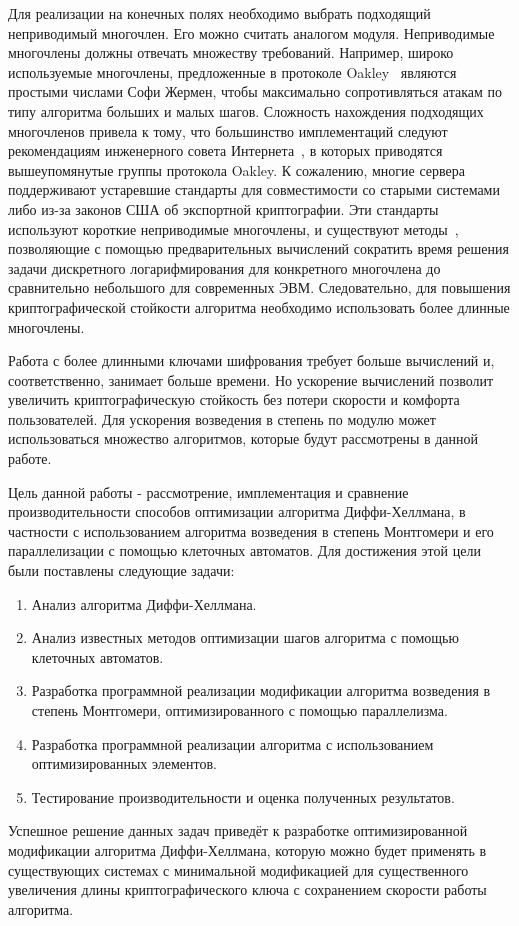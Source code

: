 \documentclass[times,specification,annotation]{itmo-student-thesis}
\begin{document}
Для реализации на конечных полях необходимо выбрать подходящий неприводимый многочлен.
Его можно считать аналогом модуля.
Неприводимые многочлены должны отвечать множеству требований.
Например, широко используемые многочлены, предложенные в протоколе Oakley~\cite{rfc2412} являются простыми числами
Софи Жермен, чтобы максимально сопротивляться атакам по типу алгоритма больших и малых шагов.
Сложность нахождения подходящих многочленов привела к тому, что большинство имплементаций следуют рекомендациям
инженерного совета Интернета~\cite{rfc7296}, в которых приводятся вышеупомянутые группы протокола Oakley.
К сожалению, многие сервера поддерживают устаревшие стандарты для совместимости со старыми системами либо
из-за законов США об экспортной криптографии.
Эти стандарты используют короткие неприводимые многочлены, и существуют методы~\cite{adr15},
позволяющие с помощью предварительных вычислений сократить время решения задачи дискретного логарифмирования для
конкретного многочлена до сравнительно небольшого для современных ЭВМ.
Следовательно, для повышения криптографической стойкости алгоритма необходимо использовать более длинные многочлены.\par
Работа с более длинными ключами шифрования требует больше вычислений и, соответственно, занимает больше времени.
Но ускорение вычислений позволит увеличить криптографическую стойкость без потери скорости и комфорта пользователей.
Для ускорения возведения в степень по модулю может использоваться множество алгоритмов, которые будут рассмотрены в
данной работе.\par
Цель данной работы - рассмотрение, имплементация и сравнение производительности способов оптимизации алгоритма
Диффи-Хеллмана, в частности с использованием алгоритма возведения в степень Монтгомери и его параллелизации
с помощью клеточных автоматов.
Для достижения этой цели были поставлены следующие задачи:
\begin{enumerate}[label=\arabic*.]
    \item Анализ алгоритма Диффи-Хеллмана.
    \item Анализ известных методов оптимизации шагов алгоритма с помощью клеточных автоматов.
    \item Разработка программной реализации модификации алгоритма возведения в степень Монтгомери, оптимизированного с помощью параллелизма.
    \item Разработка программной реализации алгоритма с использованием оптимизированных элементов.
    \item Тестирование производительности и оценка полученных результатов.
\end{enumerate}
Успешное решение данных задач приведёт к разработке оптимизированной модификации алгоритма Диффи-Хеллмана,
которую можно будет применять в существующих системах с минимальной модификацией для существенного увеличения длины
криптографического ключа с сохранением скорости работы алгоритма.\par
\end{document}
